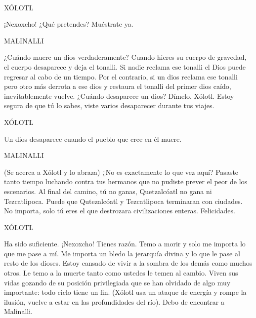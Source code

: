 \documentclass[11pt,letterpaper]{article}
\begin{document}
\begin{center}
\\
\par
 XÓLOTL
\\
\par
¡Nexoxcho! ¿Qué pretendes? Muéstrate ya.
\\
\par
MALINALLI
\\
\par
¿Cuándo muere un dios verdaderamente? Cuando hieres su cuerpo de gravedad, el cuerpo desaparece y deja el tonalli. Si nadie reclama ese tonalli el Dios puede regresar al cabo de un tiempo. Por el contrario, si un dios reclama ese tonalli pero otro más derrota a ese dios y restaura el tonalli del primer dios caído, inevitablemente vuelve. ¿Cuándo desaparece un dios? Dímelo, Xólotl. Estoy segura de que tú lo sabes, viste varios desaparecer durante tus viajes.
\\
\par
XÓLOTL
\\
\par
Un dios desaparece cuando el pueblo que cree en él muere.
\\
\par
MALINALLI
\\
\par
(Se acerca a Xólotl y lo abraza) ¿No es exactamente lo que vez aquí? Pasaste tanto tiempo luchando contra tus hermanos que no pudiste prever el peor de los escenarios. Al final del camino, tú no ganas, Quetzalcóatl no gana ni Tezcatlipoca. Puede que Qutezalcóatl y Tezcatlipoca terminaran con ciudades. No importa, solo tú eres el que destrozara civilizaciones enteras. Felicidades.
\\
\par
XÓLOTL
\\
\par
Ha sido suficiente. ¡Nexoxcho! Tienes razón. Temo a morir y solo me importa lo que me pase a mí. Me importa un bledo la jerarquía divina y lo que le pase al resto de los dioses. Estoy cansado de vivir a la sombra de los demás como muchos otros. Le temo a la muerte tanto como ustedes le temen al cambio. Viven sus vidas gozando de su posición privilegiada que se han olvidado de algo muy importante: todo ciclo tiene un fin. (Xólotl usa un ataque de energía y rompe la ilusión, vuelve a estar en las profundidades del río). Debo de encontrar a Malinalli.  
\end{center}
\end{document}
